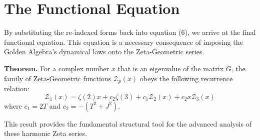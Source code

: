 \documentclass[11pt]{article}
\newcommand{\Z}{\mathcal{Z}}
\newcommand{\T}{\ensuremath{T}}
\newcommand{\J}{\ensuremath{J}}
\begin{document}
\section{The Functional Equation}
By substituting the re-indexed forms back into equation (6), we arrive at the final functional equation. This equation is a necessary consequence of imposing the Golden Algebra's dynamical laws onto the Zeta-Geometric series.

\textbf{Theorem.} For a complex number $x$ that is an eigenvalue of the matrix $G$, the family of Zeta-Geometric functions $\Z_p(x)$ obeys the following recurrence relation:
\begin{equation}
    \Z_1(x) = \zeta(2)x + c_2\zeta(3) + c_1 \Z_2(x) + c_2 x\Z_3(x)
\end{equation}
where $c_1 = 2\T$ and $c_2 = -(\T^2+\J^2)$.

This result provides the fundamental structural tool for the advanced analysis of these harmonic Zeta series.
\end{document}
